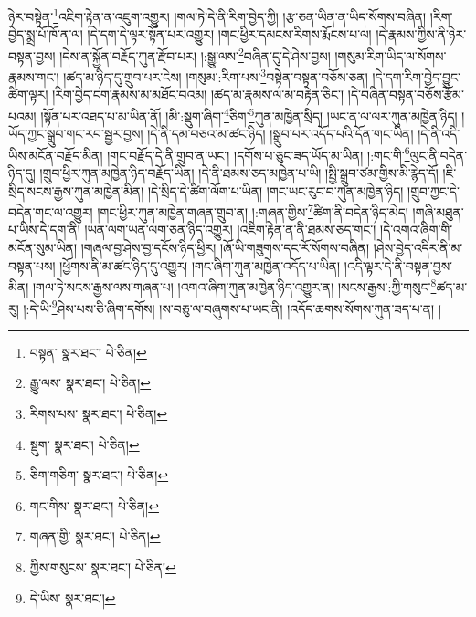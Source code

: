 ཉེར་བསྟེན་\footnote{བསྟན་  སྣར་ཐང་།  པེ་ཅིན། }འཇིག་རྟེན་ན་འཇུག་འགྱུར། །གལ་ཏེ་དེ་ནི་རིག་བྱེད་ཀྱི། །རྩ་ཅན་ཡིན་ན་ཡིད་སོགས་བཞིན། །རིག་བྱེད་སྨྲ་པོ་ཁོ་ན་ལ། །དེ་དག་དེ་ལྟར་སྟོན་པར་འགྱུར། །གང་ཕྱིར་དམངས་རིགས་རྨོངས་པ་ལ། །དེ་རྣམས་ཀྱིས་ནི་ཉེར་བསྟན་བྱས། །དེས་ན་སྐྱོན་བརྗོད་ཀུན་རྫོབ་པར། །:སྒྱུ་ལས་\footnote{རྒྱུ་ལས་  སྣར་ཐང་།  པེ་ཅིན། }བཞིན་དུ་དེ་ཤེས་བྱས། །གསུམ་རིག་ཡིད་ལ་སོགས་རྣམས་གང་། །ཚད་མ་ཉིད་དུ་གྲུབ་པར་ངེས། །གསུམ་:རིག་པས་\footnote{རིགས་པས་  སྣར་ཐང་།  པེ་ཅིན། }བསྟེན་བསྟན་བཅོས་ཅན། །དེ་དག་རིག་བྱེད་བྱུང་ཚིག་ལྟར། །རིག་བྱེད་ངག་རྣམས་མ་མཐོང་བའམ། །ཚད་མ་རྣམས་ལ་མ་བརྟེན་ཅིང་། །དེ་བཞིན་བསྟན་བཅོས་རྩོམ་པའམ། །སྟོན་པར་འཐད་པ་མ་ཡིན་ནོ། །མི་:སྡུག་ཞིག་\footnote{སྡུག་  སྣར་ཐང་།  པེ་ཅིན། }ཅིག་\footnote{ཅིག་གཅིག་  སྣར་ཐང་།  པེ་ཅིན། }ཀུན་མཁྱེན་སྲིད། །ཡང་ན་ལ་ལར་ཀུན་མཁྱེན་ཉིད། །ཡོད་ཀྱང་སྒྲུབ་གང་རབ་སྦྱར་བྱས། །དེ་ནི་དམ་བཅའ་མ་ཚང་ཉིད། །སྒྲུབ་པར་འདོད་པའི་དོན་གང་ཡིན། །དེ་ནི་འདི་ཡིས་མངོན་བརྗོད་མིན། །གང་བརྗོད་དེ་ནི་གྲུབ་ན་ཡང་། །དགོས་པ་ཅུང་ཟད་ཡོད་མ་ཡིན། །:གང་གི་\footnote{གང་གིས་  སྣར་ཐང་།  པེ་ཅིན། }ལུང་ནི་བདེན་ཉིད་དུ། །གྲུབ་ཕྱིར་ཀུན་མཁྱེན་ཉིད་བརྗོད་ཡིན། །དེ་ནི་ཐམས་ཅད་མཁྱེན་པ་ཡི། །སྤྱི་སྒྲུབ་ཙམ་གྱིས་མི་རྙེད་དོ། །ཇི་སྲིད་སངས་རྒྱས་ཀུན་མཁྱེན་མིན། །དེ་སྲིད་དེ་ཚིག་ལོག་པ་ཡིན། །གང་ཡང་རུང་བ་ཀུན་མཁྱེན་ཉིད། །གྲུབ་ཀྱང་དེ་བདེན་གང་ལ་འགྱུར། །གང་ཕྱིར་ཀུན་མཁྱེན་གཞན་གྲུབ་ན། །:གཞན་གྱིས་\footnote{གཞན་གྱི་  སྣར་ཐང་།  པེ་ཅིན། }ཚིག་ནི་བདེན་ཉིད་མེད། །གཞི་མཐུན་པ་ཡིས་དེ་དག་ནི། །ཡན་ལག་ཡན་ལག་ཅན་ཉིད་འགྱུར། །འཇིག་རྟེན་ན་ནི་ཐམས་ཅད་གང་། །དེ་འགའ་ཞིག་གི་མངོན་སུམ་ཡིན། །གཞལ་བྱ་ཤེས་བྱ་དངོས་ཉིད་ཕྱིར། །ཞོ་ཡི་གཟུགས་དང་རོ་སོགས་བཞིན། །ཤེས་བྱེད་འདིར་ནི་མ་བསྟན་པས། །ཕྱོགས་ནི་མ་ཚང་ཉིད་དུ་འགྱུར། །གང་ཞིག་ཀུན་མཁྱེན་འདོད་པ་ཡིན། །འདི་ལྟར་དེ་ནི་བསྟན་བྱས་མིན། །གལ་ཏེ་སངས་རྒྱས་ལས་གཞན་པ། །འགའ་ཞིག་ཀུན་མཁྱེན་ཉིད་འགྱུར་ན། །སངས་རྒྱས་:ཀྱི་གསུང་\footnote{ཀྱིས་གསུངས་  སྣར་ཐང་།  པེ་ཅིན། }ཚད་མ་རུ། །:དེ་ཡི་\footnote{དེ་ཡིས་  སྣར་ཐང་། }ཤེས་པས་ཅི་ཞིག་དགོས། །ས་བཅུ་ལ་བཞུགས་པ་ཡང་ནི། །འདོད་ཆགས་སོགས་ཀུན་ཟད་པ་ན། །
